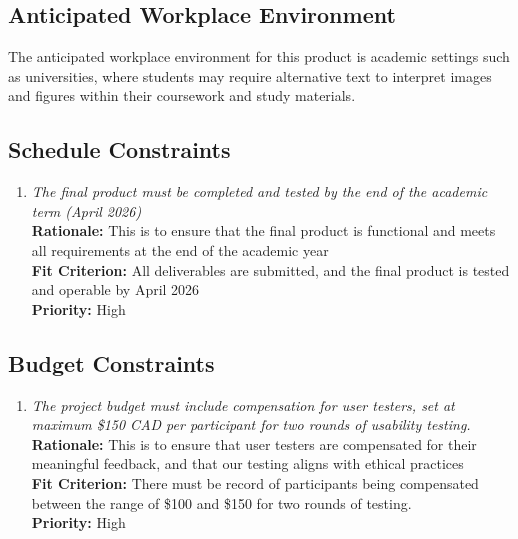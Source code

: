 \documentclass[12pt]{article}
\begin{document}
\subsection{Anticipated Workplace Environment}
The anticipated workplace environment for this product is academic settings such as universities, where students may 
require alternative text to interpret images and figures within their coursework and study materials. 
\subsection{Schedule Constraints}
\begin{enumerate}[label=MD-SC \arabic*., wide=0pt, leftmargin=*]
  \item \emph{The final product must be completed and tested by the end of the academic term (April 2026)}\\[2mm]
    {\bf Rationale:} This is to ensure that the final product is functional and meets all requirements
    at the end of the academic year\\
    {\bf Fit Criterion:} All deliverables are submitted, and the final product is tested and operable by April 2026 \\
    {\bf Priority:} High
\end{enumerate}
\subsection{Budget Constraints}
\begin{enumerate}[label=MD-BC \arabic*., wide=0pt, leftmargin=*]
  \item \emph{The project budget must include compensation for user testers, set at maximum \$150 CAD per participant for two rounds of usability testing.}\\[2mm]
    {\bf Rationale:} This is to ensure that user testers are compensated for their meaningful feedback, 
    and that our testing aligns with ethical practices\\
    {\bf Fit Criterion:} There must be record of participants being compensated between the range of \$100 and \$150 for
    two rounds of testing. \\
    {\bf Priority:} High
\end{enumerate}
\end{document}
